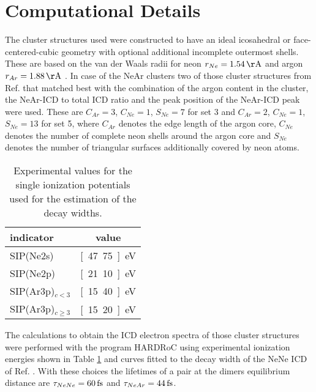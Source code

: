 \section{Computational Details}
\label{sec:computational}
The cluster structures used were constructed to have an ideal icosahedral or
face-centered-cubic geometry with optional additional incomplete outermost
shells. These are based on the van der Waals radii for neon
$r_{Ne}=\unit[1.54]{\AA}$
and argon $r_{Ar}=\unit[1.88]{\AA}$ \cite{Bondi64}.
In case of the NeAr clusters two of those
cluster structures from Ref. \cite{Fasshauer14_1} that matched best
with the combination of the argon content in the cluster,
the NeAr-ICD to total
ICD ratio and the peak position of the NeAr-ICD peak were used.
These are $C_{Ar}=3$, $C_{Ne}=1$, $S_{Ne}=7$
for set 3
and $C_{Ar}=2$, $C_{Ne}=1$, $S_{Ne}=13$ for set 5, where $C_{Ar}$ denotes
the edge length of the argon core, $C_{Ne}$ denotes the number of complete
neon shells around the argon core and $S_{Ne}$ denotes the number of 
triangular surfaces additionally covered by neon atoms.


\begin{table}[h]
 \caption{Experimental values for the single ionization potentials
          \cite{Fasshauer14_1}
          used for the estimation of the decay widths.}
 \label{table:exp_input}
 \centering
 \begin{tabular}{lc}
  \toprule
  indicator            &  value \\
  \midrule
  SIP(Ne2s)            &  \unit[47.75]{eV} \\
  SIP(Ne2p)            &  \unit[21.10]{eV} \\
  SIP(Ar3p)$_{c<3}$    &  \unit[15.40]{eV} \\
  SIP(Ar3p)$_{c\ge 3}$ &  \unit[15.20]{eV} \\
  \bottomrule
 \end{tabular}
\end{table}


The calculations to obtain the ICD electron spectra of those cluster
structures were performed with
the program HARDRoC \cite{HARDRoC} using experimental ionization energies shown
in Table \ref{table:exp_input} and curves fitted to the decay width of the
NeNe ICD of Ref. \cite{Averbukh06_1}. With these choices the lifetimes of a
pair at the dimers equilibrium distance are $\tau_{NeNe}= \unit[60]{fs}$ and
$\tau_{NeAr}= \unit[44]{fs}$.
